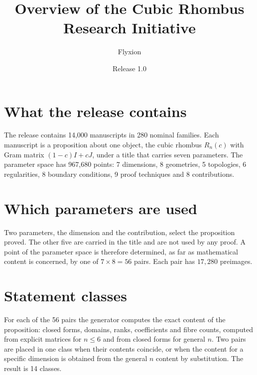 \documentclass[11pt]{article}
\title{Overview of the Cubic Rhombus Research Initiative}
\author{Flyxion}
\date{Release 1.0}
\begin{document}
\maketitle
\section{What the release contains}
The release contains 14,000 manuscripts in 280 nominal families. Each manuscript is a proposition about one object, the cubic rhombus $R_n(c)$ with Gram matrix $(1-c)I+cJ$, under a title that carries seven parameters. The parameter space has 967,680 points: 7 dimensions, 8 geometries, 5 topologies, 6 regularities, 8 boundary conditions, 9 proof techniques and 8 contributions.

\section{Which parameters are used}
Two parameters, the dimension and the contribution, select the proposition proved. The other five are carried in the title and are not used by any proof. A point of the parameter space is therefore determined, as far as mathematical content is concerned, by one of $7\times8=56$ pairs. Each pair has $17{,}280$ preimages.

\section{Statement classes}
For each of the 56 pairs the generator computes the exact content of the proposition: closed forms, domains, ranks, coefficients and fibre counts, computed from explicit matrices for $n\le6$ and from closed forms for general $n$. Two pairs are placed in one class when their contents coincide, or when the content for a specific dimension is obtained from the general $n$ content by substitution. The result is 14 classes.
\end{document}
